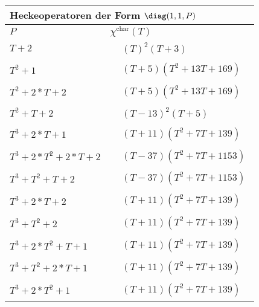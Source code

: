 \begin{tabular}{| l | l |}
\multicolumn{2}{l}{\bf Heckeoperatoren der Form $\diag(1,1,P)$} \\
\hline
$P$ & $\chi^\text{char}(T)$ \\
\hline
$T + 2$ &
$\!\begin{aligned}
	&(T)^{2}(T + 3)\end{aligned}$ \\
\hline
$T^2 + 1$ &
$\!\begin{aligned}
	&(T + 5)(T^{2} + 13T + 169)\end{aligned}$ \\
\hline
$T^2 + 2*T + 2$ &
$\!\begin{aligned}
	&(T + 5)(T^{2} + 13T + 169)\end{aligned}$ \\
\hline
$T^2 + T + 2$ &
$\!\begin{aligned}
	&(T - 13)^{2}(T + 5)\end{aligned}$ \\
\hline
$T^3 + 2*T + 1$ &
$\!\begin{aligned}
	&(T + 11)(T^{2} + 7T + 139)\end{aligned}$ \\
\hline
$T^3 + 2*T^2 + 2*T + 2$ &
$\!\begin{aligned}
	&(T - 37)(T^{2} + 7T + 1153)\end{aligned}$ \\
\hline
$T^3 + T^2 + T + 2$ &
$\!\begin{aligned}
	&(T - 37)(T^{2} + 7T + 1153)\end{aligned}$ \\
\hline
$T^3 + 2*T + 2$ &
$\!\begin{aligned}
	&(T + 11)(T^{2} + 7T + 139)\end{aligned}$ \\
\hline
$T^3 + T^2 + 2$ &
$\!\begin{aligned}
	&(T + 11)(T^{2} + 7T + 139)\end{aligned}$ \\
\hline
$T^3 + 2*T^2 + T + 1$ &
$\!\begin{aligned}
	&(T + 11)(T^{2} + 7T + 139)\end{aligned}$ \\
\hline
$T^3 + T^2 + 2*T + 1$ &
$\!\begin{aligned}
	&(T + 11)(T^{2} + 7T + 139)\end{aligned}$ \\
\hline
$T^3 + 2*T^2 + 1$ &
$\!\begin{aligned}
	&(T + 11)(T^{2} + 7T + 139)\end{aligned}$ \\
\hline
\end{tabular}


